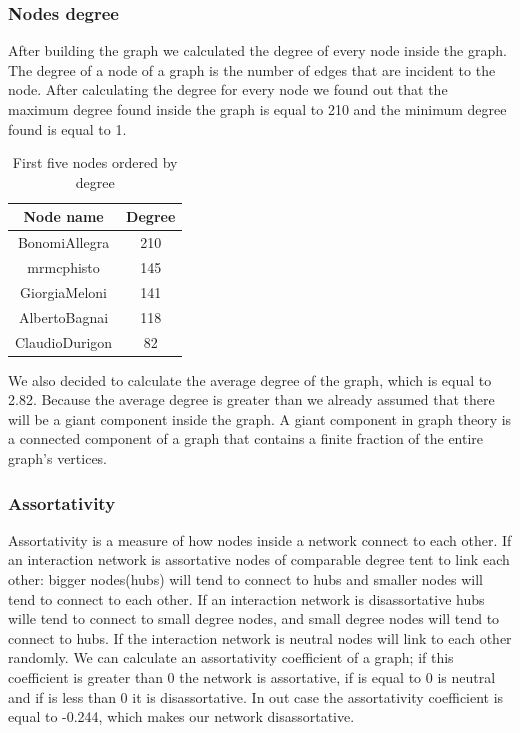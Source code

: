 \documentclass[12pt,journal,compsoc]{IEEEtran}
\begin{document}
\subsubsection{Nodes degree}
After building the graph we calculated the degree of every node inside the graph. The degree of a node of a graph is the number of edges that are incident to the node. After calculating the degree for every node we found out that the maximum degree found inside the graph is equal to 210 and the minimum degree found is equal to 1. 
\begin{table}[ht]
\centering
\begin{tabular}{c c }
	Node name & Degree  \\
	\hline
	BonomiAllegra & 210  \\
	mrmcphisto & 145  \\
	GiorgiaMeloni & 141  \\
	AlbertoBagnai & 118  \\
	ClaudioDurigon & 82  \\
\end{tabular}
\caption{First five nodes ordered by degree}
\end{table}

We also decided to calculate the average degree of the graph, which is equal to 2.82. Because the average degree is greater than we already assumed that there will be a giant component inside the graph. A giant component in graph theory is a connected component of a graph that contains a finite fraction of the entire graph's vertices.

\subsubsection{Assortativity}
Assortativity is a measure of how nodes inside a network connect to each other. If an interaction network is assortative nodes of comparable degree tent to link each other: bigger nodes(hubs) will tend to connect to hubs and smaller nodes will tend to connect to each other. If an interaction network is disassortative hubs wille tend to connect to small degree nodes, and small degree nodes will tend to connect to hubs. If the interaction network is neutral nodes will link to each other randomly.
We can calculate an assortativity coefficient of a graph; if this coefficient is greater than 0 the network is assortative, if is equal to 0 is neutral and if is less than 0 it is disassortative.
In out case the assortativity coefficient is equal to -0.244, which makes our network disassortative.
\end{document}
